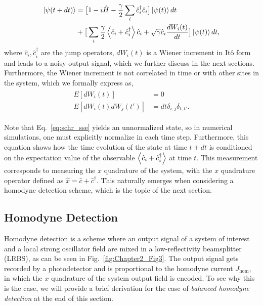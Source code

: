 \begin{align}
\label{eq:schr_sse}
\begin{split}
    \ket{\psi(t+dt)} &= \big[ 1 - i \hat{H} - \frac{\gamma}{2} \sum\limits_i \hat{c}^\dagger_i \hat{c}_i \big] \ket{\psi(t)} dt \\ 
&+ \big[ \sum\limits_i \frac{\gamma}{2} \expval{\hat{c}_i+\hat{c}^\dagger_i} \hat{c}_i + \sqrt{\gamma} \hat{c}_i \frac{dW_i(t)}{dt} \big] \ket{\psi(t)} dt,
\end{split}
\end{align}
where $\hat{c}_i,\hat{c}^\dagger_i$ are the jump operators, $dW_i(t)$ is a Wiener increment in It\^o form \cite{wiseman2009} and leads to a noisy output signal, which we further discuss in the next sections. Furthermore, the Wiener increment is not correlated in time or with other sites in the system, which we formally express as, 
\begin{align}
\begin{split}
\label{eq:noise}
        E[dW_i(t)] &= 0 \\
        E[dW_i(t) dW_j(t')] &= dt \delta_{i,j} \delta_{t,t'}.
\end{split}
\end{align}

Note that Eq.~\ref{eq:schr_sse} yields an unnormalized state, so in numerical simulations, one must explicitly normalize in each time step. Furthermore, this equation shows how the time evolution of the state at time $t+dt$ is conditioned on the expectation value of the observable $\expval{\hat{c}_i+\hat{c}^\dagger_i}$ at time $t$. This measurement corresponds to measuring the $x$ quadrature of the system, with the $x$ quadrature operator defined as $\hat{x} = \hat{c}+\hat{c}^\dagger$. This naturally emerges when considering a homodyne detection scheme, which is the topic of the next section. 

\subsection{Homodyne Detection}
\label{subsec:hom_detec}

Homodyne detection is a scheme where an output signal of a system of interest and a local strong oscillator field are mixed in a low-reflectivity beamsplitter (LRBS), as can be seen in Fig.~\ref{fig:Chapter2_Fig3}. The output signal gets recorded by a photodetector and is proportional to the homodyne current $J_\text{hom}$, in which the $x$ quadrature of the system output field is encoded. To see why this is the case, we will provide a brief derivation for the case of \textit{balanced homodyne detection} at the end of this section.

